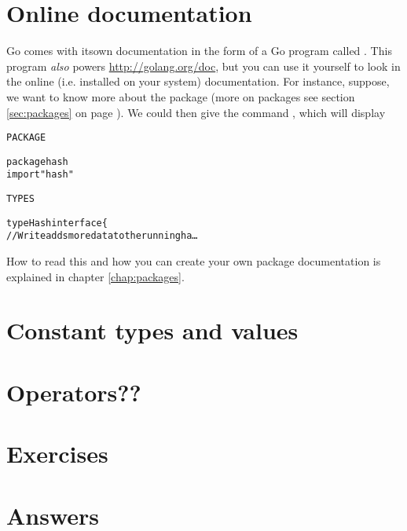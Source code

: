 \section{Online documentation}
Go comes with itsown  documentation in the form of a Go program called
. This program \emph{also} powers
\url{http://golang.org/doc}, but you can use it yourself to look
in the online (i.e. installed on your system) documentation. For
instance, suppose, we want to know more about the package  
(more on packages see section \ref{sec:packages} on page
\pageref{sec:packages}). We could then give the command
, which will display
\begin{alltt}
PACKAGE

package hash
import "hash"

TYPES

type Hash interface \{
    // Write adds more data to the running ha \ldots
\end{alltt}
How to read this and how you can create your own package documentation
is explained in chapter \ref{chap:packages}.

\section{Constant types and values} %

\section{Operators??}



\section{Exercises}





\cleardoublepage
\section{Answers}
\shipoutAnswer
